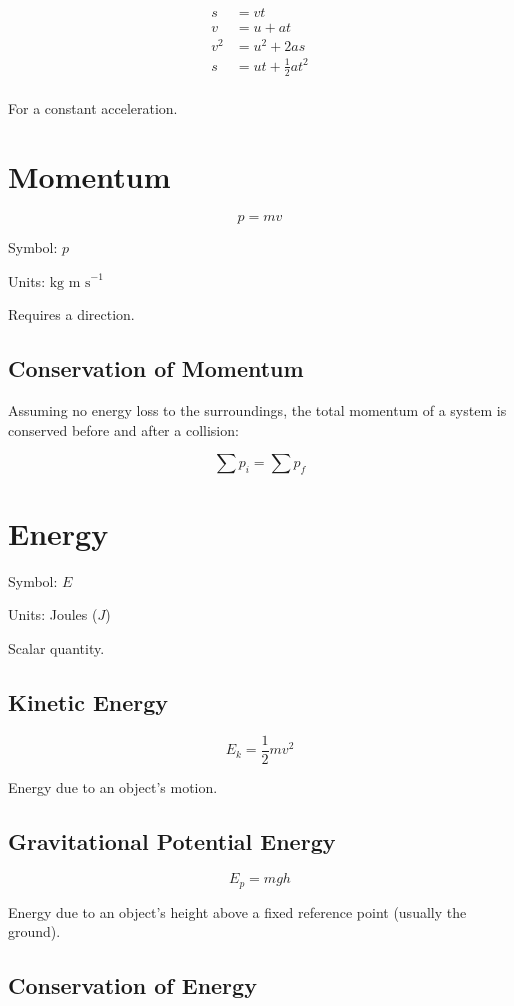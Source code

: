 \documentclass[a4paper,11pt]{report}
\begin{document}
$$
\begin{aligned}
s & = vt \\
v & = u + at \\
v^2 & = u^2 + 2as \\
s & = ut + \frac{1}{2}at^2 \\
\end{aligned}
$$

For a constant acceleration.


\section{Momentum}

$$
p = mv
$$

Symbol: $p$

Units: $\mbox{kg m s}^{-1}$

Requires a direction.

\subsection{Conservation of Momentum}

Assuming no energy loss to the surroundings, the total momentum of a system is
conserved before and after a collision:

$$
\sum p_i = \sum p_f
$$


\section{Energy}

Symbol: $E$

Units: Joules ($J$)

Scalar quantity.

\subsection{Kinetic Energy}

$$
E_k = \frac{1}{2}mv^2
$$

Energy due to an object's motion.

\subsection{Gravitational Potential Energy}

$$
E_p = mgh
$$

Energy due to an object's height above a fixed reference point (usually the
ground).

\subsection{Conservation of Energy}
\end{document}
